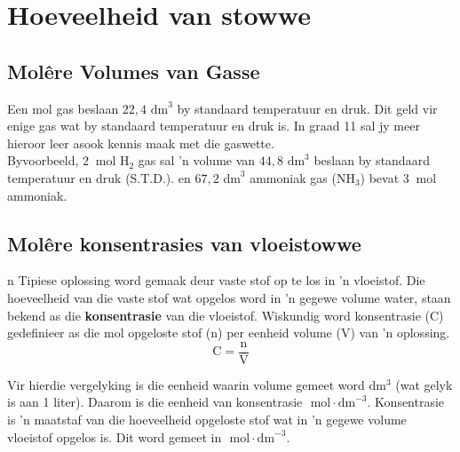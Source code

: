 \section{Hoeveelheid van stowwe}
            \subsection*{Mol\^{e}re Volumes van Gasse}
            \nopagebreak
            \par
            \label{m38712*eip-id1168064596799}
  {Een mol gas beslaan $22,4{\text{ dm}}^{3}$ by standaard temperatuur en druk. } 
Dit geld vir enige gas wat by standaard temperatuur en druk is. In graad 11 sal jy meer hieroor leer asook kennis maak met die gaswette.\\
Byvoorbeeld, $2~\text{ mol}$ $\text{H}_2$ gas sal 'n volume van $44,8{\text{ dm}}^{3}$ beslaan by standaard temperatuur en druk (S.T.D.). en $67,2{\text{ dm}}^{3}$ ammoniak gas ($\text{NH}_3$) bevat $3~\text{ mol}$ ammoniak.
    \label{m38712*cid8}
            \subsection*{Mol\^{e}re konsentrasies van vloeistowwe}
            \nopagebreak
n Tipiese oplossing word gemaak deur vaste stof op te los in 'n vloeistof. Die hoeveelheid van die vaste stof wat opgelos word in  'n gegewe volume water, staan bekend as die \textbf{konsentrasie} van die vloeistof. Wiskundig word konsentrasie (C) gedefinieer as die mol opgeloste stof (n) per eenheid volume (V) van  'n oplossing.\\
      \label{m38712*id282860}\nopagebreak\noindent{}      
    \begin{equation*}
    \text{C}=\frac{\text{n}}{\text{V}}
      \end{equation*}
	\begin{figure}[H] %
\begin{center}
\end{center}
 \end{figure}
Vir hierdie vergelyking is die eenheid waarin volume gemeet word $\text{dm}{}^{3}$ (wat gelyk is aan 1 liter). Daarom is die eenheid van  konsentrasie  $\text{ mol} \cdot {\text{dm}}^{-3}$. 
\label{m38712*fhsst!!!underscore!!!id1650}
 {Konsentrasie is 'n maatstaf van die hoeveelheid opgeloste stof wat in 'n gegewe volume vloeistof opgelos is. Dit word gemeet in $\text{ mol} \cdot {\text{dm}}^{-3}$.} 
 
